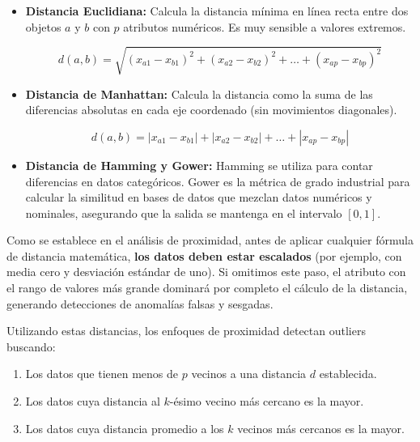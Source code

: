 \begin{itemize}
	
	\item \textbf{Distancia Euclidiana:} Calcula la distancia mínima en línea recta entre dos objetos $a$ y $b$ con $p$ atributos numéricos. Es muy sensible a valores extremos.
	
	\[
	d(a,b) = \sqrt{
		(x_{a1}-x_{b1})^2 +
		(x_{a2}-x_{b2})^2 +
		\dots +
		(x_{ap}-x_{bp})^2
	}
	\]
	
	\item \textbf{Distancia de Manhattan:} Calcula la distancia como la suma de las diferencias absolutas en cada eje coordenado (sin movimientos diagonales).
	
	\[
	d(a,b) =
	|x_{a1} - x_{b1}| +
	|x_{a2} - x_{b2}| +
	\dots +
	|x_{ap} - x_{bp}|
	\]
	
	\item \textbf{Distancia de Hamming y Gower:} Hamming se utiliza para contar diferencias en datos categóricos. Gower es la métrica de grado industrial para calcular la similitud en bases de datos que mezclan datos numéricos y nominales, asegurando que la salida se mantenga en el intervalo $[0, 1]$.
	
\end{itemize}

\begin{tcolorbox}[
	colback=red!5,
	colframe=red!70!black,
	title=Escalamiento de Datos
	]
	
	Como se establece en el análisis de proximidad, antes de aplicar cualquier fórmula de distancia matemática, \textbf{los datos deben estar escalados} (por ejemplo, con media cero y desviación estándar de uno). Si omitimos este paso, el atributo con el rango de valores más grande dominará por completo el cálculo de la distancia, generando detecciones de anomalías falsas y sesgadas.
	
\end{tcolorbox}

Utilizando estas distancias, los enfoques de proximidad detectan outliers buscando:

\begin{enumerate}
	\item Los datos que tienen menos de $p$ vecinos a una distancia $d$ establecida.
	
	\item Los datos cuya distancia al $k$-ésimo vecino más cercano es la mayor.
	
	\item Los datos cuya distancia promedio a los $k$ vecinos más cercanos es la mayor.
\end{enumerate}

